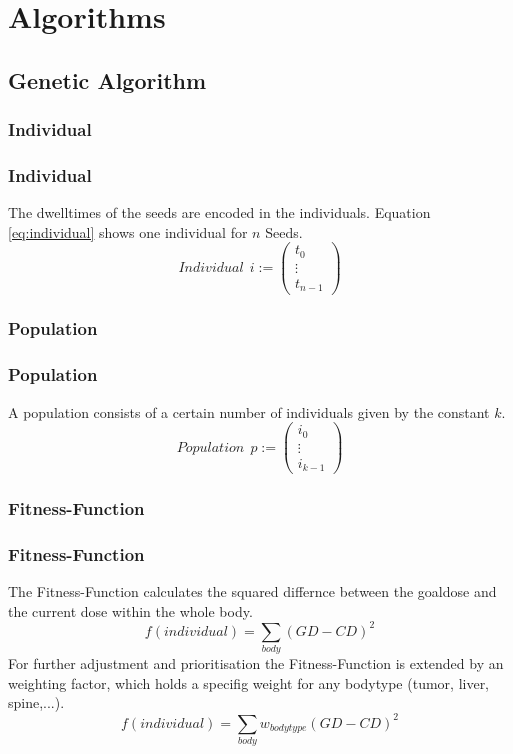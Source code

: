 \documentclass{beamer}
\begin{document}
\section{Algorithms}
\frame{\tableofcontents[currentsection]}
\subsection{Genetic Algorithm}
\frame{\tableofcontents[currentsubsection]}
\subsubsection{Individual}

 \begin{frame}
 \frametitle{Individual}
 The dwelltimes of the seeds are encoded in the individuals. Equation \eqref{eq:individual} shows one individual for $n  $ Seeds.
 \begin{equation}
 \label{eq:individual}
 Individual \ \ i := \begin{pmatrix}
 t_{0} \\ \vdots \\ t_{n-1} 	
\end{pmatrix}   
 \end{equation}
 \end{frame}
 
\subsubsection{Population}
 \begin{frame}
 \frametitle{Population}
 A population consists of a certain number of individuals given by the constant $ k $.
 \begin{equation}
 \label{eq:population}
 Population \ \ p := \begin{pmatrix}
 i_{0} \\ \vdots \\ i_{k-1} 	
\end{pmatrix}   
 \end{equation}
 \end{frame}
 
 \subsubsection{Fitness-Function}
 \begin{frame}
 \frametitle{Fitness-Function}
 The Fitness-Function calculates the squared differnce between the goaldose and the current dose within the whole body.
 \begin{equation}
 f(individual) = \sum_{body}(GD-CD)^2
 \end{equation}
 For further adjustment and prioritisation the Fitness-Function is extended by an weighting factor, which holds a specifig weight for any bodytype (tumor, liver, spine,...).
 \begin{equation}
 f(individual) = \sum_{body}w_{bodytype}(GD-CD)^2
 \end{equation}
 \end{frame}
 
\end{document}
